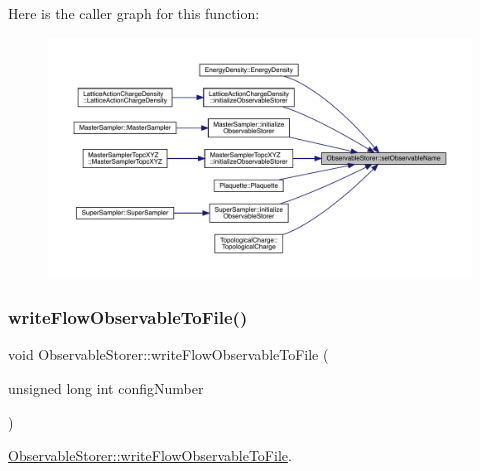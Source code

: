 Here is the caller graph for this function\+:
\nopagebreak
\begin{figure}[H]
\begin{center}
\leavevmode
\includegraphics[width=350pt]{class_observable_storer_a7f4847c4fdbf8764d8f07950c4d4b62a_icgraph}
\end{center}
\end{figure}
\mbox{\label{class_observable_storer_af51ebd65eae2a5087cfd47ddf230da93}} 
\subsubsection{\texorpdfstring{writeFlowObservableToFile()}{writeFlowObservableToFile()}}
{\footnotesize\ttfamily void Observable\+Storer\+::write\+Flow\+Observable\+To\+File (\begin{DoxyParamCaption}\item[{unsigned long int}]{config\+Number }\end{DoxyParamCaption})}



\mbox{\hyperlink{class_observable_storer_af51ebd65eae2a5087cfd47ddf230da93}{Observable\+Storer\+::write\+Flow\+Observable\+To\+File}}. 


